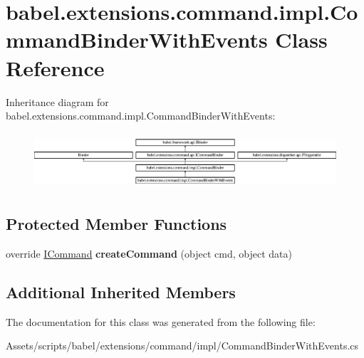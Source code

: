 \hypertarget{classbabel_1_1extensions_1_1command_1_1impl_1_1_command_binder_with_events}{\section{babel.\-extensions.\-command.\-impl.\-Command\-Binder\-With\-Events Class Reference}
\label{classbabel_1_1extensions_1_1command_1_1impl_1_1_command_binder_with_events}
}
Inheritance diagram for babel.\-extensions.\-command.\-impl.\-Command\-Binder\-With\-Events\-:\begin{figure}[H]
\begin{center}
\leavevmode
\includegraphics[height=2.103286cm]{classbabel_1_1extensions_1_1command_1_1impl_1_1_command_binder_with_events}
\end{center}
\end{figure}
\subsection*{Protected Member Functions}
\begin{DoxyCompactItemize}
\item 
\hypertarget{classbabel_1_1extensions_1_1command_1_1impl_1_1_command_binder_with_events_a6738d6d2ea289b007adc65aa23378ac2}{override \hyperlink{interfacebabel_1_1extensions_1_1command_1_1api_1_1_i_command}{I\-Command} {\bfseries create\-Command} (object cmd, object data)}\label{classbabel_1_1extensions_1_1command_1_1impl_1_1_command_binder_with_events_a6738d6d2ea289b007adc65aa23378ac2}

\end{DoxyCompactItemize}
\subsection*{Additional Inherited Members}


The documentation for this class was generated from the following file\-:\begin{DoxyCompactItemize}
\item 
Assets/scripts/babel/extensions/command/impl/Command\-Binder\-With\-Events.\-cs\end{DoxyCompactItemize}
